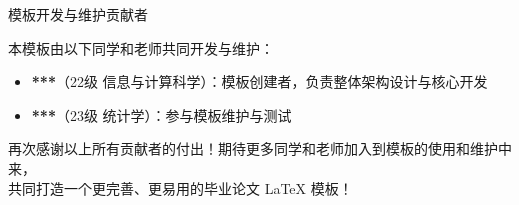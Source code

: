 \cleardoublepage
\thispagestyle{empty}
\begin{center}
    {\xiaobiaosong 模板开发与维护贡献者}
\end{center}

\vspace{1em}

\begin{center}
\noindent{}
\end{center}

\vspace{1.5em}

\noindent 本模板由以下同学和老师共同开发与维护：
\begin{itemize}
    \item \textbf{***}（22级 信息与计算科学）：模板创建者，负责整体架构设计与核心开发
    \item \textbf{***}（23级 统计学）：参与模板维护与测试
\end{itemize}

\vfill

\begin{center}
\kaishu
再次感谢以上所有贡献者的付出！期待更多同学和老师加入到模板的使用和维护中来，\\
共同打造一个更完善、更易用的毕业论文 \LaTeX{} 模板！
\end{center}

\vspace{2cm}

\vspace{2cm}
